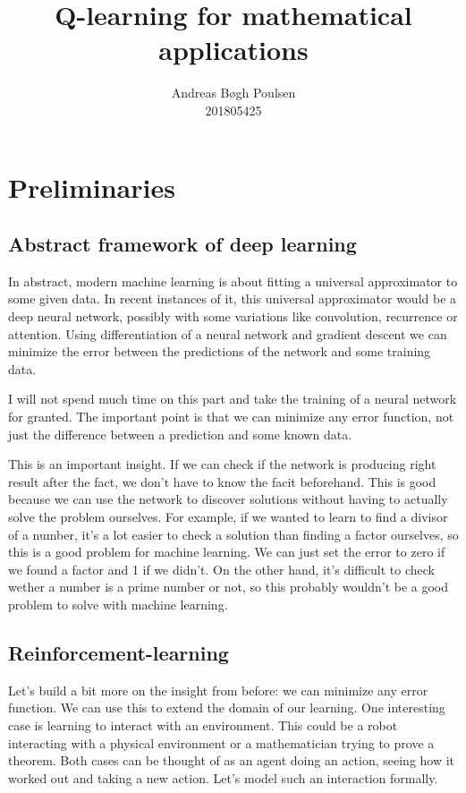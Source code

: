 \documentclass{article}
\title{Q-learning for mathematical applications}
\author{
    Andreas Bøgh Poulsen\\
    201805425
}
\theoremstyle{changedot}
\theoremstyle{changedotbreak}
\theoremstyle{nonumberplain}
\begin{document}
\maketitle

\section{Preliminaries}

\subsection{Abstract framework of deep learning}
In abstract, modern machine learning is about fitting a universal approximator
to some given data. In recent instances of it, this universal approximator would
be a deep neural network, possibly with some variations like convolution,
recurrence or attention. Using differentiation of a neural network and gradient
descent we can minimize the error between the predictions of the network and
some training data.

I will not spend much time on this part and take the training of a neural
network for granted. The important point is that we can minimize any error
function, not just the difference between a prediction and some known data.

This is an important insight. If we can check if the network is producing right
result after the fact, we don't have to know the facit beforehand. This is good
because we can use the network to discover solutions without having to actually
solve the problem ourselves. For example, if we wanted to learn to find a
divisor of a number, it's a lot easier to check a solution than finding a factor
ourselves, so this is a good problem for machine learning. We can just set the
error to zero if we found a factor and 1 if we didn't. On the other hand, it's
difficult to check wether a number is a prime number or not, so this probably
wouldn't be a good problem to solve with machine learning.

\subsection{Reinforcement-learning}
Let's build a bit more on the insight from before: we can minimize any error
function. We can use this to extend the domain of our learning. One interesting
case is learning to interact with an environment. This could be a robot
interacting with a physical environment or a mathematician trying to prove a
theorem. Both cases can be thought of as an agent doing an action, seeing how it
worked out and taking a new action. Let's model such an interaction formally.
\end{document}
